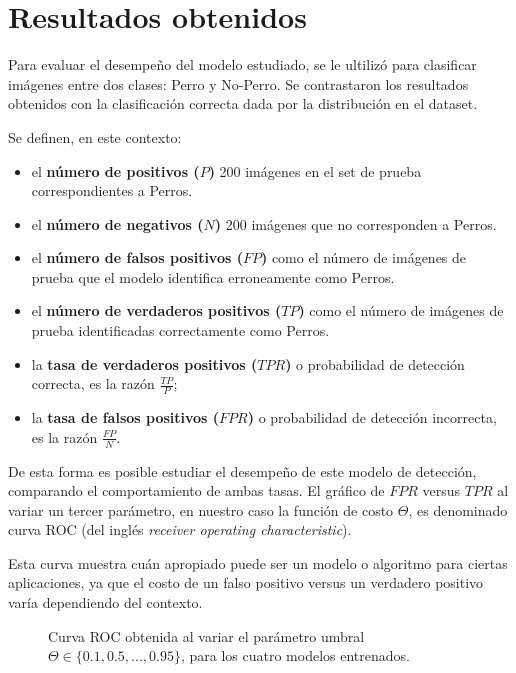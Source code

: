 \documentclass[12pt]{article}
\begin{document}
\section{Resultados obtenidos}

Para evaluar el desempeño del modelo estudiado, se le ultilizó para clasificar
imágenes entre dos clases: Perro y No-Perro. Se contrastaron los resultados
obtenidos con la clasificación correcta dada por la distribución en el dataset.

Se definen, en este contexto: 

\begin{itemize}
    \item el \textbf{número de positivos ($P$)} 200 imágenes en el set de prueba correspondientes a Perros.
    \item el \textbf{número de negativos ($N$)} 200 imágenes que no corresponden a Perros.
    \item el \textbf{número de falsos positivos ($FP$)} como el número de
        imágenes de prueba que el modelo identifica erroneamente como Perros.
    \item el \textbf{número de verdaderos positivos ($TP$)} como el número de
        imágenes de prueba identificadas correctamente como Perros.
    \item la \textbf{tasa de verdaderos positivos ($TPR$)} o probabilidad de detección correcta, es la razón $\frac{TP}{P}$;
    \item la \textbf{tasa de falsos positivos ($FPR$)} o probabilidad de detección incorrecta, es la razón $\frac{FP}{N}$.
\end{itemize}

De esta forma es posible estudiar el desempeño de este modelo de detección, comparando el comportamiento de ambas tasas.
El gráfico de $FPR$ versus $TPR$ al variar un tercer parámetro, en nuestro caso la función de costo $\Theta$, es denominado curva
ROC (del inglés \emph{receiver operating characteristic}).

Esta curva muestra
cuán apropiado puede ser un modelo o algoritmo para ciertas aplicaciones, ya que
el costo de un falso positivo versus un verdadero positivo varía dependiendo del
contexto.

\begin{figure}[h]
    \centering

    \caption{Curva ROC obtenida al variar el parámetro umbral $\Theta \in \{ 0.1,0.5,...,0.95\}$, para los cuatro modelos entrenados.}
\end{figure}
\end{document}
